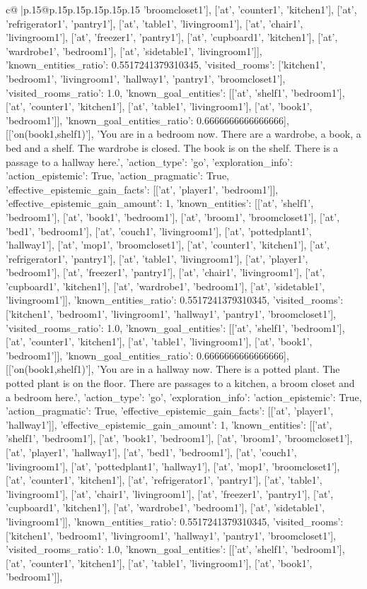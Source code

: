 \documentclass{article}
\begin{document}
{\begin{supertabular}{c@{$\;$}|p{.15\linewidth}@{}p{.15\linewidth}p{.15\linewidth}p{.15\linewidth}p{.15\linewidth}p{.15\linewidth}}
{{{'broomcloset1'], ['at', 'counter1', 'kitchen1'], ['at', 'refrigerator1', 'pantry1'], ['at', 'table1', 'livingroom1'], ['at', 'chair1', 'livingroom1'], ['at', 'freezer1', 'pantry1'], ['at', 'cupboard1', 'kitchen1'], ['at', 'wardrobe1', 'bedroom1'], ['at', 'sidetable1', 'livingroom1']], 'known_entities_ratio': 0.5517241379310345, 'visited_rooms': ['kitchen1', 'bedroom1', 'livingroom1', 'hallway1', 'pantry1', 'broomcloset1'], 'visited_rooms_ratio': 1.0, 'known_goal_entities': [['at', 'shelf1', 'bedroom1'], ['at', 'counter1', 'kitchen1'], ['at', 'table1', 'livingroom1'], ['at', 'book1', 'bedroom1']], 'known_goal_entities_ratio': 0.6666666666666666}}], [['on(book1,shelf1)'], 'You are in a bedroom now. There are a wardrobe, a book, a bed and a shelf. The wardrobe is closed. The book is on the shelf. There is a passage to a hallway here.', {'action_type': 'go', 'exploration_info': {'action_epistemic': True, 'action_pragmatic': True, 'effective_epistemic_gain_facts': [['at', 'player1', 'bedroom1']], 'effective_epistemic_gain_amount': 1, 'known_entities': [['at', 'shelf1', 'bedroom1'], ['at', 'book1', 'bedroom1'], ['at', 'broom1', 'broomcloset1'], ['at', 'bed1', 'bedroom1'], ['at', 'couch1', 'livingroom1'], ['at', 'pottedplant1', 'hallway1'], ['at', 'mop1', 'broomcloset1'], ['at', 'counter1', 'kitchen1'], ['at', 'refrigerator1', 'pantry1'], ['at', 'table1', 'livingroom1'], ['at', 'player1', 'bedroom1'], ['at', 'freezer1', 'pantry1'], ['at', 'chair1', 'livingroom1'], ['at', 'cupboard1', 'kitchen1'], ['at', 'wardrobe1', 'bedroom1'], ['at', 'sidetable1', 'livingroom1']], 'known_entities_ratio': 0.5517241379310345, 'visited_rooms': ['kitchen1', 'bedroom1', 'livingroom1', 'hallway1', 'pantry1', 'broomcloset1'], 'visited_rooms_ratio': 1.0, 'known_goal_entities': [['at', 'shelf1', 'bedroom1'], ['at', 'counter1', 'kitchen1'], ['at', 'table1', 'livingroom1'], ['at', 'book1', 'bedroom1']], 'known_goal_entities_ratio': 0.6666666666666666}}], [['on(book1,shelf1)'], 'You are in a hallway now. There is a potted plant. The potted plant is on the floor. There are passages to a kitchen, a broom closet and a bedroom here.', {'action_type': 'go', 'exploration_info': {'action_epistemic': True, 'action_pragmatic': True, 'effective_epistemic_gain_facts': [['at', 'player1', 'hallway1']], 'effective_epistemic_gain_amount': 1, 'known_entities': [['at', 'shelf1', 'bedroom1'], ['at', 'book1', 'bedroom1'], ['at', 'broom1', 'broomcloset1'], ['at', 'player1', 'hallway1'], ['at', 'bed1', 'bedroom1'], ['at', 'couch1', 'livingroom1'], ['at', 'pottedplant1', 'hallway1'], ['at', 'mop1', 'broomcloset1'], ['at', 'counter1', 'kitchen1'], ['at', 'refrigerator1', 'pantry1'], ['at', 'table1', 'livingroom1'], ['at', 'chair1', 'livingroom1'], ['at', 'freezer1', 'pantry1'], ['at', 'cupboard1', 'kitchen1'], ['at', 'wardrobe1', 'bedroom1'], ['at', 'sidetable1', 'livingroom1']], 'known_entities_ratio': 0.5517241379310345, 'visited_rooms': ['kitchen1', 'bedroom1', 'livingroom1', 'hallway1', 'pantry1', 'broomcloset1'], 'visited_rooms_ratio': 1.0, 'known_goal_entities': [['at', 'shelf1', 'bedroom1'], ['at', 'counter1', 'kitchen1'], ['at', 'table1', 'livingroom1'], ['at', 'book1', 'bedroom1']], }}}
\end{supertabular}}
\end{document}
